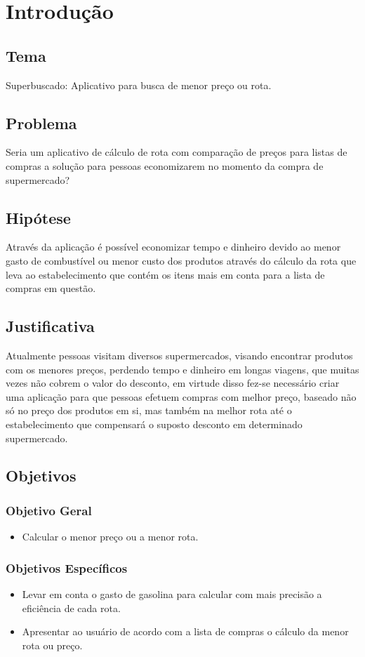 
\chapter{Introdução}

\section{Tema}
Superbuscado: Aplicativo para busca de menor preço ou rota.

\section{Problema}
Seria um aplicativo de cálculo de rota com comparação de preços para listas de compras a solução para pessoas economizarem no momento da compra de supermercado?

\section{Hipótese}
Através da aplicação é possível economizar tempo e dinheiro devido ao menor gasto de combustível ou menor custo dos produtos através do cálculo da rota que leva ao estabelecimento que contém os itens mais em conta para a lista de compras em questão.

\section{Justificativa}
Atualmente pessoas visitam diversos supermercados, visando encontrar produtos com os menores preços, perdendo tempo e dinheiro em longas viagens, que muitas vezes não cobrem o valor do desconto, em virtude disso fez-se necessário criar uma aplicação para que pessoas efetuem compras com melhor preço, baseado não só no preço dos produtos em si, mas também na melhor rota até o estabelecimento que compensará o suposto desconto em determinado supermercado.

\section{Objetivos}
	\subsection{Objetivo Geral}
	\begin{itemize}
		\item Calcular o menor preço ou a menor rota.
	\end{itemize}
	\subsection{Objetivos Específicos}
	\begin{itemize}
		\item Levar em conta o gasto de gasolina para calcular com mais precisão a eficiência de cada rota.
		\item Apresentar ao usuário de acordo com a lista de compras o cálculo da menor rota ou preço.
	\end{itemize}
	

